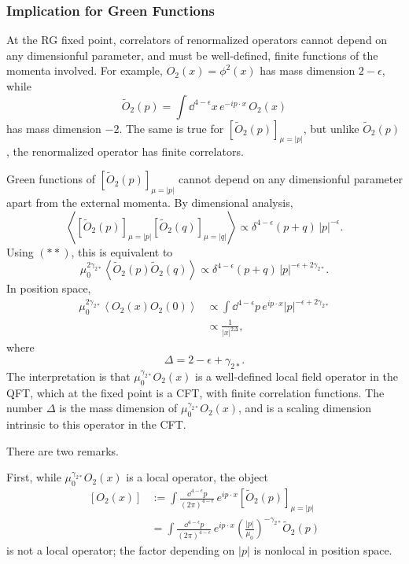 \subsubsection{Implication for Green Functions}

At the RG fixed point, correlators of renormalized operators cannot depend on
any dimensionful parameter, and must be well-defined, finite functions of the
momenta involved.  For example, \(O_2(x)=\phi^2(x)\) has mass dimension
\(2-\epsilon\), while
\[
  \widetilde O_2(p)
  =
  \int \dd^{4-\epsilon}x\,e^{-ip\cdot x}\,O_2(x)
\]
has mass dimension \(-2\).  The same is true for
\([\widetilde O_2(p)]_{\mu=|p|}\), but unlike \(\widetilde O_2(p)\), the
renormalized operator has finite correlators.

Green functions of \([\widetilde O_2(p)]_{\mu=|p|}\) cannot depend on any
dimensionful parameter apart from the external momenta.  By dimensional
analysis,
\[
  \left\langle
    [\widetilde O_2(p)]_{\mu=|p|}
    [\widetilde O_2(q)]_{\mu=|q|}
  \right\rangle
  \propto
  \delta^{4-\epsilon}(p+q)\,|p|^{-\epsilon}.
\]
Using \((**)\), this is equivalent to
\[
  \mu_0^{2\gamma_{2*}}
  \left\langle \widetilde O_2(p)\widetilde O_2(q)\right\rangle
  \propto
  \delta^{4-\epsilon}(p+q)\,|p|^{-\epsilon+2\gamma_{2*}}.
\]
In position space,
\[
\begin{aligned}
  \mu_0^{2\gamma_{2*}}
  \left\langle O_2(x)O_2(0)\right\rangle
  &\propto
  \int \dd^{4-\epsilon}p\,
  e^{ip\cdot x}|p|^{-\epsilon+2\gamma_{2*}}
\\
  &\propto
  \frac{1}{|x|^{2\Delta}},
\end{aligned}
\]
where
\[
  \Delta=2-\epsilon+\gamma_{2*}.
\]
The interpretation is that \(\mu_0^{\gamma_{2*}}O_2(x)\) is a well-defined
local field operator in the QFT, which at the fixed point is a CFT, with finite
correlation functions.  The number \(\Delta\) is the mass dimension of
\(\mu_0^{\gamma_{2*}}O_2(x)\), and is a scaling dimension intrinsic to this
operator in the CFT.

There are two remarks.

First, while \(\mu_0^{\gamma_{2*}}O_2(x)\) is a local operator, the object
\[
\begin{aligned}
  [O_2(x)]
  &:=
  \int\frac{\dd^{4-\epsilon}p}{(2\pi)^{4-\epsilon}}\,
  e^{ip\cdot x}[\widetilde O_2(p)]_{\mu=|p|}
\\
  &=
  \int\frac{\dd^{4-\epsilon}p}{(2\pi)^{4-\epsilon}}\,
  e^{ip\cdot x}
  \left(\frac{|p|}{\mu_0}\right)^{-\gamma_{2*}}
  \widetilde O_2(p)
\end{aligned}
\]
is not a local operator; the factor depending on \(|p|\) is nonlocal in
position space.

